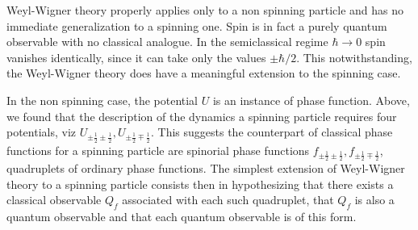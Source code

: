 \documentclass{article}
\begin{document}
Weyl-Wigner theory properly applies only to a non spinning particle and has no immediate generalization to a spinning one. Spin is in fact a purely quantum observable with no classical analogue. In the semiclassical regime $\hbar \rightarrow 0$ spin vanishes identically, since it can take only the values $\pm \hbar / 2$. This notwithstanding, the Weyl-Wigner theory does have a meaningful extension to the spinning case.

In the non spinning case, the potential $U$ is an instance of phase function. Above, we found that the description of the dynamics a spinning particle requires four potentials, viz $U_{ \pm \frac{1}{2} \pm \frac{1}{2}}, U_{ \pm \frac{1}{2} \mp \frac{1}{2}}$. This suggests the counterpart of classical phase functions for a spinning particle are spinorial phase functions $f_{ \pm \frac{1}{2} \pm \frac{1}{2}}, f_{ \pm \frac{1}{2} \mp \frac{1}{2}}$, quadruplets of ordinary phase functions. The simplest extension of Weyl-Wigner theory to a spinning particle consists then in hypothesizing that there exists a classical observable $Q_{f}$ associated with each such quadruplet, that $Q_{f}$ is also a quantum observable and that each quantum observable is of this form.
\end{document}
